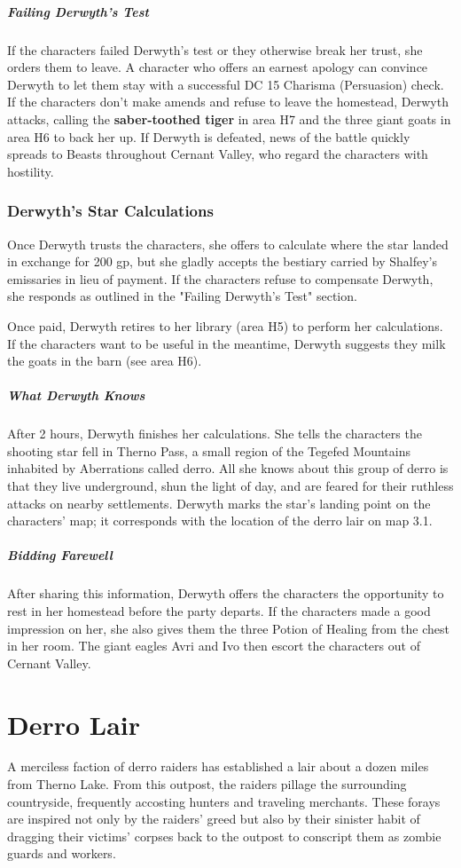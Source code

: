 \documentclass[10pt,a4paper,twoside,bg=print,twocolumn,openany,nodeprecatedcode]{dndbook}
\begin{document}
\subparagraph{Failing Derwyth's Test}
If the characters failed Derwyth's test or they otherwise break her trust, she orders them to leave. A character who offers an earnest apology can convince Derwyth to let them stay with a successful DC 15 Charisma (Persuasion) check. If the characters don't make amends and refuse to leave the homestead, Derwyth attacks, calling the \textbf{saber-toothed tiger} in area H7 and the three giant goats in area H6 to back her up. If Derwyth is defeated, news of the battle quickly spreads to Beasts throughout Cernant Valley, who regard the characters with hostility.

\subsubsection{Derwyth's Star Calculations}
Once Derwyth trusts the characters, she offers to calculate where the star landed in exchange for 200 gp, but she gladly accepts the bestiary carried by Shalfey's emissaries in lieu of payment. If the characters refuse to compensate Derwyth, she responds as outlined in the "Failing Derwyth's Test" section.

Once paid, Derwyth retires to her library (area H5) to perform her calculations. If the characters want to be useful in the meantime, Derwyth suggests they milk the goats in the barn (see area H6).

\subparagraph{What Derwyth Knows}
After 2 hours, Derwyth finishes her calculations. She tells the characters the shooting star fell in Therno Pass, a small region of the Tegefed Mountains inhabited by Aberrations called derro. All she knows about this group of derro is that they live underground, shun the light of day, and are feared for their ruthless attacks on nearby settlements. Derwyth marks the star's landing point on the characters' map; it corresponds with the location of the derro lair on map 3.1.

\subparagraph{Bidding Farewell}
After sharing this information, Derwyth offers the characters the opportunity to rest in her homestead before the party departs. If the characters made a good impression on her, she also gives them the three Potion of Healing from the chest in her room. The giant eagles Avri and Ivo then escort the characters out of Cernant Valley.

\section{Derro Lair}
A merciless faction of derro raiders has established a lair about a dozen miles from Therno Lake. From this outpost, the raiders pillage the surrounding countryside, frequently accosting hunters and traveling merchants. These forays are inspired not only by the raiders' greed but also by their sinister habit of dragging their victims' corpses back to the outpost to conscript them as zombie guards and workers.
\end{document}
